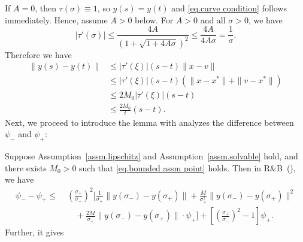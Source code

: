\documentclass[moor,sglanonrev]{informs4}
\begin{document}
\begin{APPENDICES}
{\begin{equation*}
    \end{equation*}
    }
    If $A=0$, then $\tau(\sigma)\equiv1$, so $y(s)=y(t)$ and \eqref{eq.curve condition} follows immediately. Hence, assume $A>0$ below.
    For $A>0$ and all $\sigma>0$, we have
    \begin{equation*}
        \left|\tau'(\sigma)\right| \leq \frac{4A}{\left(1+\sqrt{1+4A\sigma}\right)^2}  \leq \frac{4A}{4A\sigma}  = \frac{1}{\sigma}.
    \end{equation*}
    Therefore we have
    \begin{equation*}
        \begin{aligned}
            \|y(s)-y(t)\| & \leq \left|\tau'(\xi)\right|(s-t)\|x-v\|                          \\
                          & \leq \left|\tau'(\xi)\right|(s-t)\left(\|x-x^*\|+\|v-x^*\|\right) \\
                          & \leq 2M_0\left|\tau'(\xi)\right|(s-t)                             \\
                          & \leq \frac{2M_0}{t}(s-t).
        \end{aligned}
    \end{equation*}
    \Halmos \endproof
    Next, we proceed to introduce the lemma with analyzes the difference between $\psi_-$ and $\psi_+$:
    \begin{lemma}
        \label{lem.bound gap bisection}
        Suppose Assumption~\ref{assm.lipschitz} and Assumption~\ref{assm.solvable} hold, and there exists $M_0>0$ such that \eqref{eq.bounded assm point} holds. Then in \textnormal{R\&B}~(), we have
        \begin{equation}\label{eq.bound gap bisection}
            \begin{aligned}
                \psi_- - \psi_+
                \leq\; & \left( \frac{\sigma_+}{\sigma_-} \right)^2 \Bigg[
                    \frac{1}{\sigma_+} \|y(\sigma_-)-y(\sigma_+)\|
                + \frac{M}{\sigma_+^2} \|y(\sigma_-)-y(\sigma_+)\|^2                          \\
                       & \quad + \frac{2M}{\sigma_+} \|y(\sigma_-)-y(\sigma_+)\| \cdot \psi_+
                    \Bigg]
                + \left[ \left( \frac{\sigma_+}{\sigma_-} \right)^2 - 1 \right] \psi_+.
            \end{aligned}
        \end{equation}
        Further, it gives
        \begin{equation}
            \label{eq.bounded gap bisection sigma}

\end{equation}
\end{lemma}
\end{APPENDICES}
\end{document}
